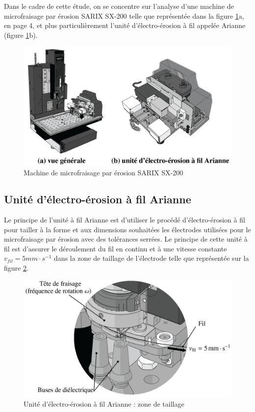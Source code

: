 Dans le cadre de cette étude, on se concentre sur l'analyse d'une machine de microfraisage par érosion SARIX SX-200 telle que représentée dans la figure \ref{img03}a, en page 4, et plus particulièrement l'unité d'électro-érosion à fil appelée Arianne (figure \ref{img03}b).

\begin{figure}[!h]
 \centering\includegraphics[width=0.9\linewidth]{img/img03}
 \caption{Machine de microfraisage par érosion SARIX SX-200}
 \label{img03}
\end{figure}

\newpage

\subsection{Unité d'électro-érosion à fil Arianne}

Le principe de l'unité à fil Arianne est d'utiliser le procédé d'électro-érosion à fil pour tailler à la forme et aux dimensions souhaitées les électrodes utilisées pour le microfraisage par érosion avec des tolérances serrées. Le principe de cette unité à fil est d'assurer le déroulement du fil en continu et à une vitesse constante $v_{fil}=5 mm\cdot s^{-1}$ dans la zone de taillage de l'électrode telle que représentée sur la figure \ref{img04}.

\begin{figure}[!h]
 \centering\includegraphics[width=0.7\linewidth]{img/img04}
 \caption{Unité d'électro-érosion à fil Arianne : zone de taillage}
 \label{img04}
\end{figure}

